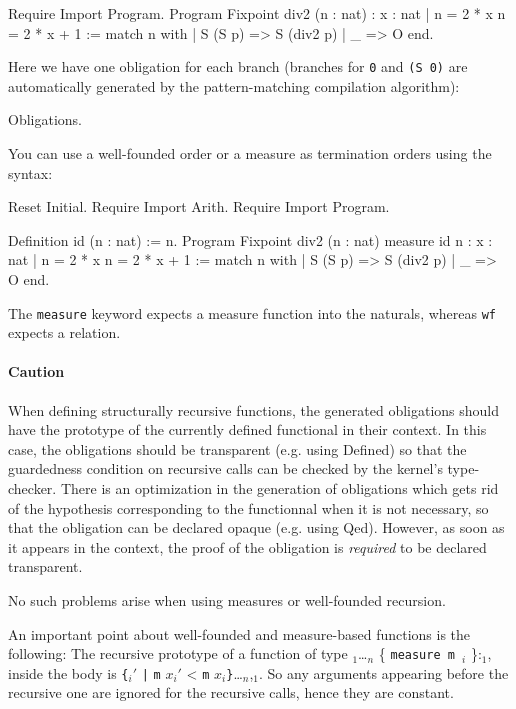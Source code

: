 \begin{coq_example}
Require Import Program.
Program Fixpoint div2 (n : nat) : { x : nat | n = 2 * x \/ n = 2 * x + 1 } :=
  match n with
  | S (S p) => S (div2 p)
  | _ => O
  end.
\end{coq_example}

Here we have one obligation for each branch (branches for \verb:0: and \verb:(S 0): are
automatically generated by the pattern-matching compilation algorithm):
\begin{coq_example}
  Obligations.
\end{coq_example}

You can use a well-founded order or a measure as termination orders using the syntax:
\begin{coq_eval}
Reset Initial.
Require Import Arith.
Require Import Program.
\end{coq_eval}
\begin{coq_example}
Definition id (n : nat) := n.
Program Fixpoint div2 (n : nat) {measure id n} :
  { x : nat | n = 2 * x \/ n = 2 * x + 1 } :=
  match n with
  | S (S p) => S (div2 p)
  | _ => O
  end.
\end{coq_example}

The \verb|measure| keyword expects a measure function into the naturals, whereas
\verb|wf| expects a relation.

\paragraph{Caution}
When defining structurally recursive functions, the
generated obligations should have the prototype of the currently defined functional
in their context. In this case, the obligations should be transparent
(e.g. using Defined) so that the guardedness condition on
recursive calls can be checked by the
kernel's type-checker. There is an optimization in the generation of
obligations which gets rid of the hypothesis corresponding to the
functionnal when it is not necessary, so that the obligation can be
declared opaque (e.g. using Qed). However, as soon as it appears in the
context, the proof of the obligation is \emph{required} to be declared transparent.

No such problems arise when using measures or well-founded recursion.

An important point about well-founded and measure-based functions is the following:
The recursive prototype of a function of type
{\binder$_1$}\ldots{\binder$_n$} \{ {\tt measure m \binder$_i$} \}:{\type$_1$}, 
inside the body is
\verb|{|{\binder$_i'$ \verb$|$ {\tt m} $x_i'$ < {\tt m} $x_i$}\verb|}|\ldots{\binder$_n$},{\type$_1$}. 
So any arguments appearing before the recursive one are ignored for the
recursive calls, hence they are constant.

